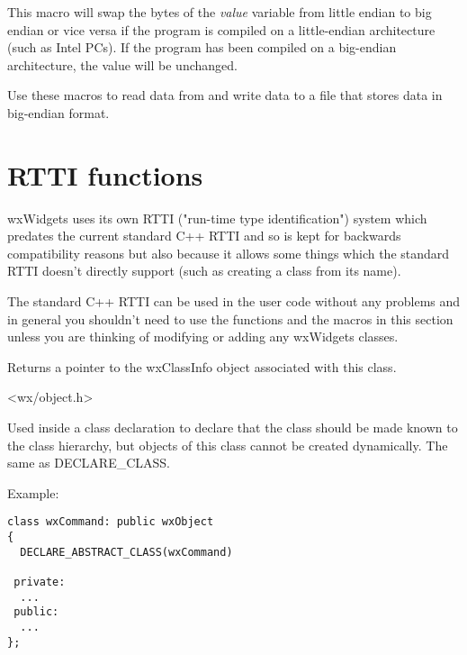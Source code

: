 This macro will swap the bytes of the {\it value} variable from little
endian to big endian or vice versa if the program is compiled on a
little-endian architecture (such as Intel PCs). If the program has
been compiled on a big-endian architecture, the value will be unchanged.

Use these macros to read data from and write data to a file that stores
data in big-endian format.



\section{RTTI functions}\label{rttimacros}

wxWidgets uses its own RTTI ("run-time type identification") system which
predates the current standard C++ RTTI and so is kept for backwards
compatibility reasons but also because it allows some things which the
standard RTTI doesn't directly support (such as creating a class from its
name).

The standard C++ RTTI can be used in the user code without any problems and in
general you shouldn't need to use the functions and the macros in this section
unless you are thinking of modifying or adding any wxWidgets classes.




\label{classinfo}


Returns a pointer to the wxClassInfo object associated with this class.


<wx/object.h>


\label{declareabstractclass}


Used inside a class declaration to declare that the class should be
made known to the class hierarchy, but objects of this class cannot be created
dynamically. The same as DECLARE\_CLASS.

Example:

\begin{verbatim}
class wxCommand: public wxObject
{
  DECLARE_ABSTRACT_CLASS(wxCommand)

 private:
  ...
 public:
  ...
};
\end{verbatim}

